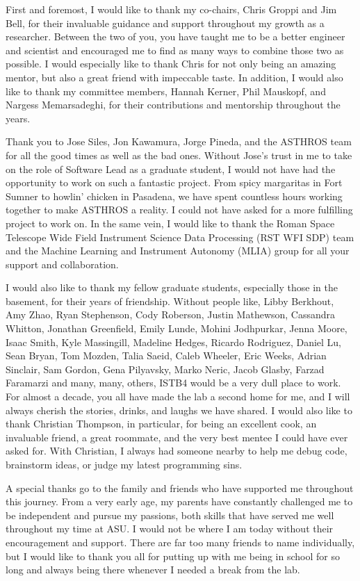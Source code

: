First and foremost, I would like to thank my co-chairs, Chris Groppi and Jim Bell, for their invaluable guidance and support throughout my growth as a researcher.
Between the two of you, you have taught me to be a better engineer and scientist and encouraged me to find as many ways to combine those two as possible.
I would especially like to thank Chris for not only being an amazing mentor, but also a great friend with impeccable taste. 
In addition, I would also like to thank my committee members, Hannah Kerner, Phil Mauskopf, and Nargess Memarsadeghi, for their contributions and mentorship throughout the years. 

Thank you to Jose Siles, Jon Kawamura, Jorge Pineda, and the ASTHROS team for all the good times as well as the bad ones.
Without Jose's trust in me to take on the role of Software Lead as a graduate student, I would not have had the opportunity to work on such a fantastic project.
From spicy margaritas in Fort Sumner to howlin' chicken in Pasadena, we have spent countless hours working together to make ASTHROS a reality. 
I could not have asked for a more fulfilling project to work on.
In the same vein, I would like to thank the Roman Space Telescope Wide Field Instrument Science Data Processing (RST WFI SDP) team and the Machine Learning and Instrument Autonomy (MLIA) group for all your support and collaboration.

I would also like to thank my fellow graduate students, especially those in the basement, for their years of friendship.
Without people like, Libby Berkhout, Amy Zhao, Ryan Stephenson, Cody Roberson, Justin Mathewson, Cassandra Whitton, Jonathan Greenfield, Emily Lunde, Mohini Jodhpurkar, Jenna Moore, Isaac Smith, Kyle Massingill, Madeline Hedges, Ricardo Rodriguez, Daniel Lu, Sean Bryan, Tom Mozden, Talia Saeid, Caleb Wheeler, Eric Weeks, Adrian Sinclair, Sam Gordon, Gena Pilyavsky, Marko Neric, Jacob Glasby, Farzad Faramarzi and many, many, others, ISTB4 would be a very dull place to work. 
For almost a decade, you all have made the lab a second home for me, and I will always cherish the stories, drinks, and laughs we have shared.
I would also like to thank Christian Thompson, in particular, for being an excellent cook, an invaluable friend, a great roommate, and the very best mentee I could have ever asked for.
With Christian, I always had someone nearby to help me debug code, brainstorm ideas, or judge my latest programming sins.

A special thanks go to the family and friends who have supported me throughout this journey. 
From a very early age, my parents have constantly challenged me to be independent and pursue my passions, both skills that have served me well throughout my time at ASU.
I would not be where I am today without their encouragement and support.
There are far too many friends to name individually, but I would like to thank you all for putting up with me being in school for so long and always being there whenever I needed a break from the lab.

